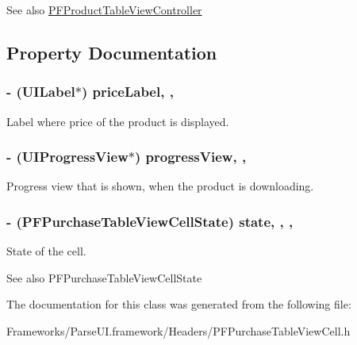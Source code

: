 \begin{DoxySeeAlso}{See also}
{\ttfamily \hyperlink{interface_p_f_product_table_view_controller}{P\+F\+Product\+Table\+View\+Controller}} 
\end{DoxySeeAlso}


\subsection{Property Documentation}
\hypertarget{interface_p_f_purchase_table_view_cell_a6378d4df911a53f6dca814d5f18af9aa}{}
\subsubsection[{price\+Label}]{\setlength{\rightskip}{0pt plus 5cm}-\/ (U\+I\+Label$\ast$) price\+Label\hspace{0.3cm}{\ttfamily [read]}, {\ttfamily [nonatomic]}, {\ttfamily [strong]}}\label{interface_p_f_purchase_table_view_cell_a6378d4df911a53f6dca814d5f18af9aa}
Label where price of the product is displayed. \hypertarget{interface_p_f_purchase_table_view_cell_a770a461f20f812e020c5b5daae002351}{}
\subsubsection[{progress\+View}]{\setlength{\rightskip}{0pt plus 5cm}-\/ (U\+I\+Progress\+View$\ast$) progress\+View\hspace{0.3cm}{\ttfamily [read]}, {\ttfamily [nonatomic]}, {\ttfamily [strong]}}\label{interface_p_f_purchase_table_view_cell_a770a461f20f812e020c5b5daae002351}
Progress view that is shown, when the product is downloading. \hypertarget{interface_p_f_purchase_table_view_cell_a8cf6055cf2d5913a1b9ae6f547354fae}{}
\subsubsection[{state}]{\setlength{\rightskip}{0pt plus 5cm}-\/ (P\+F\+Purchase\+Table\+View\+Cell\+State) state\hspace{0.3cm}{\ttfamily [read]}, {\ttfamily [write]}, {\ttfamily [nonatomic]}, {\ttfamily [assign]}}\label{interface_p_f_purchase_table_view_cell_a8cf6055cf2d5913a1b9ae6f547354fae}
State of the cell. \begin{DoxySeeAlso}{See also}
{\ttfamily P\+F\+Purchase\+Table\+View\+Cell\+State} 
\end{DoxySeeAlso}


The documentation for this class was generated from the following file\+:\begin{DoxyCompactItemize}
\item 
Frameworks/\+Parse\+U\+I.\+framework/\+Headers/P\+F\+Purchase\+Table\+View\+Cell.\+h\end{DoxyCompactItemize}
